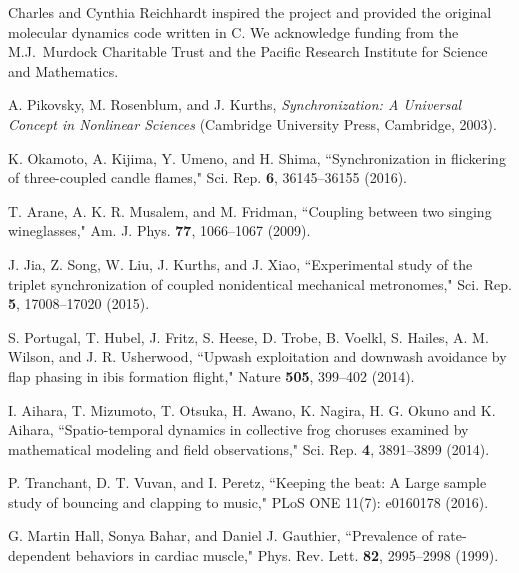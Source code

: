 \documentclass[preprint,showpacs,preprintnumbers,amsmath,amssymb,aps,prb]{revtex4-1}
\theoremstyle{remark}
\begin{document}
\begin{acknowledgments}
Charles and Cynthia Reichhardt
  inspired the project and
  provided the original molecular dynamics code
  written in  C.
  We acknowledge funding from the M.J.\ Murdock Charitable Trust
  and the Pacific Research Institute for Science and Mathematics.

\end{acknowledgments}
 
\begin{thebibliography}{99}

 A. Pikovsky, M. Rosenblum, and J. Kurths, {\it Synchronization: A Universal Concept in Nonlinear Sciences} (Cambridge University Press, Cambridge, 2003).
  
 K. Okamoto, A. Kijima, Y. Umeno, and H. Shima, ``Synchronization in flickering of three-coupled candle flames," Sci. Rep. {\bf 6}, 36145--36155 (2016).

 T. Arane, A. K. R. Musalem, and M. Fridman, ``Coupling between two singing wineglasses," Am. J. Phys. {\bf 77}, 1066--1067 (2009). %
  
  J. Jia, Z. Song, W. Liu, J. Kurths, and J. Xiao, ``Experimental study of the triplet synchronization of coupled nonidentical mechanical metronomes," Sci. Rep. {\bf 5}, 17008--17020 (2015).

  
 S. Portugal, T. Hubel, J. Fritz, S. Heese, D. Trobe, B. Voelkl, S. Hailes, A. M. Wilson, and J. R. Usherwood,   ``Upwash exploitation and downwash avoidance by flap phasing in ibis formation flight," Nature {\bf 505}, 399--402 (2014).

   I. Aihara, T. Mizumoto, T. Otsuka, H. Awano, K. Nagira, H. G. Okuno and K. Aihara, ``Spatio-temporal dynamics in collective frog choruses examined by mathematical modeling and field observations," Sci. Rep. {\bf 4}, 3891--3899 (2014). 

   P. Tranchant, D. T. Vuvan, and I. Peretz, ``Keeping the beat: A Large sample study of bouncing and clapping to music," PLoS ONE 11(7): e0160178 (2016).

   G. Martin Hall, Sonya Bahar, and Daniel J. Gauthier, ``Prevalence of rate-dependent behaviors in cardiac muscle," Phys. Rev. Lett. {\bf 82}, 2995--2998 (1999).


\end{thebibliography}
\end{document}
